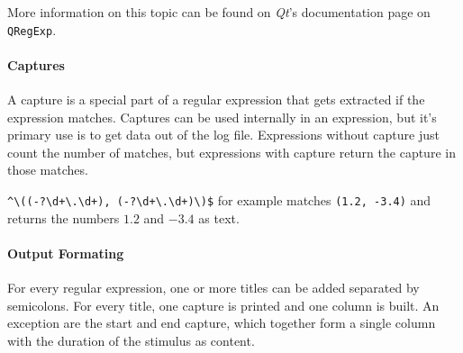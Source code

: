 More information on this topic can be found on \textit{Qt}'s documentation page on \lstinline{QRegExp}\cite{regexp}.

\paragraph{Captures}
A capture is a special part of a regular expression that gets extracted if the expression matches.
Captures can be used internally in an expression, but it's primary use is to get data out of the log file.
Expressions without capture just count the number of matches, but expressions with capture return the capture in those matches.

\verb|^\((-?\d+\.\d+), (-?\d+\.\d+)\)$| for example matches \texttt{(1.2, -3.4)} and returns the numbers $1.2$ and $-3.4$ as text.

\paragraph{Output Formating}
For every regular expression, one or more titles can be added separated by semicolons.
For every title, one capture is printed and one column is built.
An exception are the start and end capture, which together form a single column with the duration of the stimulus as content.

